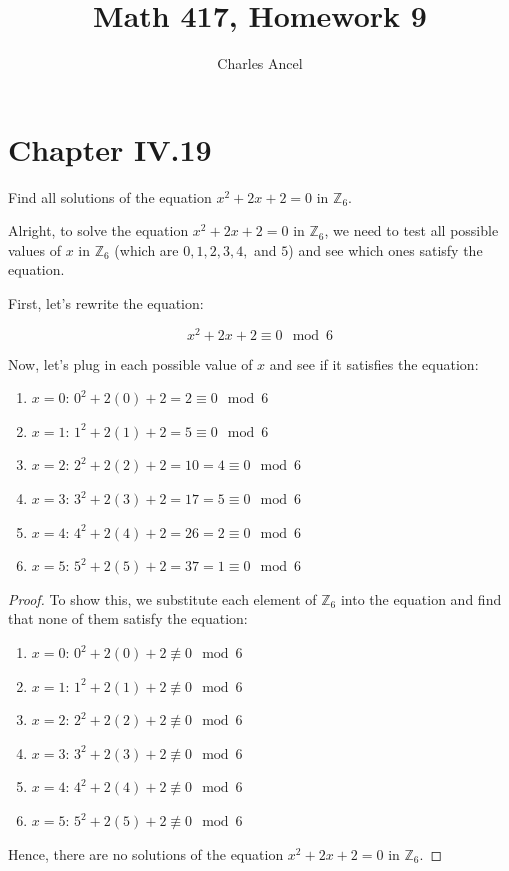 \documentclass[12pt]{amsart}
\title{Math 417, Homework 9}
\author{Charles Ancel}
\theoremstyle{definition}
\numberwithin{equation}{section}
\theoremstyle{plain}
\newcommand{\Z}{\mathbb{Z}}
\begin{document}
\maketitle
\section*{Chapter IV.19}
\begin{exercise}{3} Find all solutions of the equation $x^2 + 2x + 2 = 0$ in $\Z_6$.


    Alright, to solve the equation \( x^2 + 2x + 2 = 0 \) in \( \Z_6 \), we need to test all possible values of \( x \) in \( \Z_6 \) (which are \( 0, 1, 2, 3, 4, \) and \( 5 \)) and see which ones satisfy the equation.

    First, let's rewrite the equation:
    
    \[ x^2 + 2x + 2 \equiv 0 \mod 6 \]
    
    Now, let's plug in each possible value of \( x \) and see if it satisfies the equation:\\
\begin{enumerate}
    \item  \( x = 0 \): \( 0^2 + 2(0) + 2 = 2 \equiv 0 \mod 6 \)
    \item  \( x = 1 \): \( 1^2 + 2(1) + 2 = 5 \equiv 0 \mod 6 \)
    \item  \( x = 2 \): \( 2^2 + 2(2) + 2 = 10 = 4 \equiv 0 \mod 6 \)
    \item  \( x = 3 \): \( 3^2 + 2(3) + 2 = 17 = 5 \equiv 0 \mod 6 \)
    \item  \( x = 4 \): \( 4^2 + 2(4) + 2 = 26 = 2 \equiv 0 \mod 6 \)
    \item  \( x = 5 \): \( 5^2 + 2(5) + 2 = 37 = 1 \equiv 0 \mod 6 \)
\end{enumerate}
    
    \begin{proof}
    To show this, we substitute each element of \( \Z_6 \) into the equation and find that none of them satisfy the equation:\\
    \begin{enumerate}
        \item  \( x = 0 \): \( 0^2 + 2(0) + 2 \not\equiv 0 \mod 6 \)
        \item  \( x = 1 \): \( 1^2 + 2(1) + 2 \not\equiv 0 \mod 6 \)
        \item  \( x = 2 \): \( 2^2 + 2(2) + 2 \not\equiv 0 \mod 6 \)
        \item  \( x = 3 \): \( 3^2 + 2(3) + 2 \not\equiv 0 \mod 6 \)
        \item  \( x = 4 \): \( 4^2 + 2(4) + 2 \not\equiv 0 \mod 6 \)
        \item  \( x = 5 \): \( 5^2 + 2(5) + 2 \not\equiv 0 \mod 6 \)
    \end{enumerate}
    
    Hence, there are no solutions of the equation \(x^2 + 2x + 2 = 0\) in \( \Z_6 \).
    \end{proof}
\end{exercise}
\end{document}
